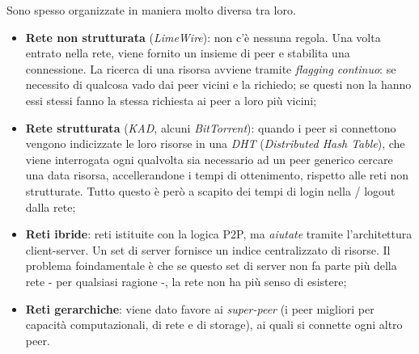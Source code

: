 Sono spesso organizzate in maniera molto diversa tra loro.
\begin{itemize}
    \item \textbf{Rete non strutturata} (\textit{LimeWire}): non c'è nessuna regola. Una volta entrato nella rete, viene fornito un insieme di peer e stabilita una connessione. La ricerca di una risorsa avviene tramite \textit{flagging continuo}: se necessito di qualcosa vado dai peer vicini e la richiedo; se questi non la hanno essi stessi fanno la stessa richiesta ai peer a loro più vicini;
    \item \textbf{Rete strutturata} (\textit{KAD}, alcuni \textit{BitTorrent}): quando i peer si connettono vengono indicizzate le loro risorse in una \textit{DHT} (\textit{Distributed Hash Table}), che viene interrogata ogni qualvolta sia necessario ad un peer generico cercare una data risorsa, accellerandone i tempi di ottenimento, rispetto alle reti non strutturate. Tutto questo è però a scapito dei tempi di login nella / logout dalla rete;
    \item \textbf{Reti ibride}: reti istituite con la logica P2P, ma \textit{aiutate} tramite l'architettura client-server. Un set di server fornisce un indice centralizzato di risorse. Il problema foindamentale è che se questo set di server non fa parte più della rete - per qualsiasi ragione -, la rete non ha più senso di esistere;
    \item \textbf{Reti gerarchiche}: viene dato favore ai \textit{super-peer} (i peer migliori per capacità computazionali, di rete e di storage), ai quali si connette ogni altro peer.
\end{itemize}

